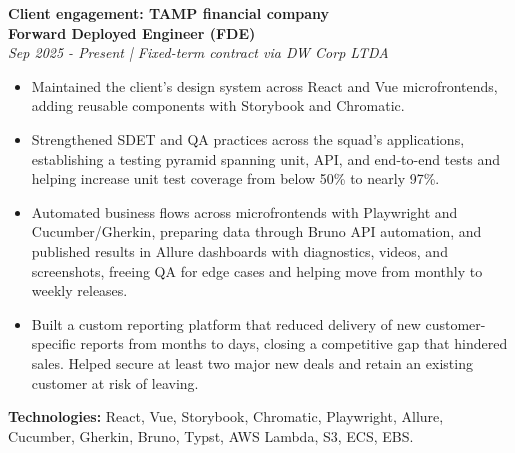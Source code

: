 \documentclass[10pt,a4paper]{altacv}
\begin{document}
\textbf{Client engagement: TAMP financial company}\\
\textbf{Forward Deployed Engineer (FDE)}\\
\textit{Sep 2025 - Present | Fixed-term contract via DW Corp LTDA}
\begin{itemize}
\setlength{\itemindent}{0.5em}
\item[--] Maintained the client's design system across React and Vue microfrontends, adding reusable components with Storybook and Chromatic.
\item[--] Strengthened SDET and QA practices across the squad's applications, establishing a testing pyramid spanning unit, API, and end-to-end tests and helping increase unit test coverage from below 50\% to nearly 97\%.
\item[--] Automated business flows across microfrontends with Playwright and Cucumber/Gherkin, preparing data through Bruno API automation, and published results in Allure dashboards with diagnostics, videos, and screenshots, freeing QA for edge cases and helping move from monthly to weekly releases.
\item[--] Built a custom reporting platform that reduced delivery of new customer-specific reports from months to days, closing a competitive gap that hindered sales. Helped secure at least two major new deals and retain an existing customer at risk of leaving.
\end{itemize}
\textbf{Technologies:} React, Vue, Storybook, Chromatic, Playwright, Allure, Cucumber, Gherkin, Bruno, Typst, AWS Lambda, S3, ECS, EBS.

\newpage
{}
\end{document}
